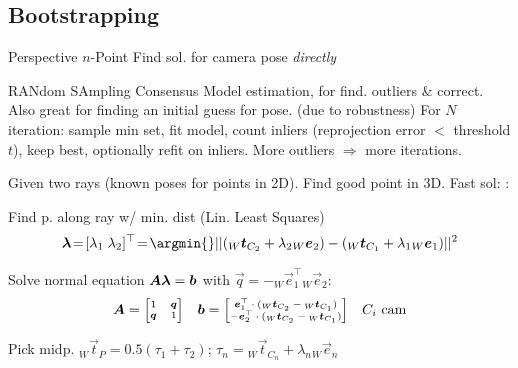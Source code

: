\subsection{Bootstrapping}

 {\scriptsize Perspective $n$-Point}
Find sol. for camera pose \textit{directly}

 {\scriptsize RANdom SAmpling Consensus} Model estimation, for find. outliers \& correct.
Also great for finding an initial guess for pose. (due to robustness)
For $N$ iteration: sample min set, fit model, count inliers (reprojection error $<$ threshold $t$), keep best, optionally refit on inliers.
More outliers $\Rightarrow$ more iterations.


 Given two rays (known poses for points in 2D).
Find good point in 3D. Fast sol: :

 Find p. along ray w/ min. dist (Lin. Least Squares)
\[
    \vec{\lambda}\! =\! [\lambda_1 \; \lambda_2]^\top\! = \! \argmin{} ||({_W}\vec{t}_{C_2} + \lambda_2 {_W}\vec{e}_2) - ({_W}\vec{t}_{C_1} + \lambda_1 {_W}\vec{e}_1)||^2
\]

\rmvspace
{} Solve normal equation $\bm{A} \bm{\lambda} = \bm{b}$ with $\vec{q} = -{_W}\vec{e}^\top_1 {_W}\vec{e}_2$:
\[
    \bm{A} =
    {\scriptsize
    \begin{bmatrix}
        1       & \bm{q} \\
        \bm{q} & 1
    \end{bmatrix}
    }
    \quad
    \bm{b} =
    {\scriptsize
    \begin{bmatrix}
        \bm{e}_1^\top \cdot ({_W}\bm{t}_{C_2} - {_W}\bm{t}_{C_1}) \\
        -\bm{e}_2^\top \cdot ({_W}\bm{t}_{C_2} - {_W}\bm{t}_{C_1})
    \end{bmatrix}
    }
    \quad C_i \text{ cam}
\]

 Pick midp. ${_W}\vec{t}_P \! = \! 0.5(\tau_1 \! + \! \tau_2)$; $\tau_n \! = \! {_W}\vec{t}_{C_n} + \lambda_n {_W}\vec{e}_n$

